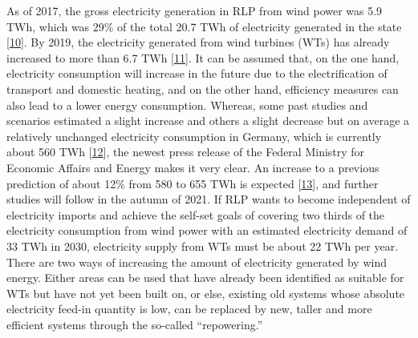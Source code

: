 \documentclass[a4paper,11pt]{article}
\begin{document}
As of 2017, the gross electricity generation in RLP from wind power was 5.9 TWh, which was 29\% of the total 20.7 TWh of electricity generated in the state {[}\protect\hyperlink{ref-Lehnert.2020}{10}{]}. By 2019, the electricity generated from wind turbines (WTs) has already increased to more than 6.7 TWh {[}\protect\hyperlink{ref-AmprionGmbH.2019}{11}{]}. It can be assumed that, on the one hand, electricity consumption will increase in the future due to the electrification of transport and domestic heating, and on the other hand, efficiency measures can also lead to a lower energy consumption. Whereas, some past studies and scenarios estimated a slight increase and others a slight decrease but on average a relatively unchanged electricity consumption in Germany, which is currently about 560 TWh {[}\protect\hyperlink{ref-NormanGerhardt.2015}{12}{]}, the newest press release of the Federal Ministry for Economic Affairs and Energy makes it very clear. An increase to a previous prediction of about 12\% from 580 to 655 TWh is expected {[}\protect\hyperlink{ref-AndreasMertens.13.07.2021}{13}{]}, and further studies will follow in the autumn of 2021. If RLP wants to become independent of electricity imports and achieve the self-set goals of covering two thirds of the electricity consumption from wind power with an estimated electricity demand of 33 TWh in 2030, electricity supply from WTs must be about 22 TWh per year. There are two ways of increasing the amount of electricity generated by wind energy. Either areas can be used that have already been identified as suitable for WTs but have not yet been built on, or else, existing old systems whose absolute electricity feed-in quantity is low, can be replaced by new, taller and more efficient systems through the so-called ``repowering.''
\end{document}
